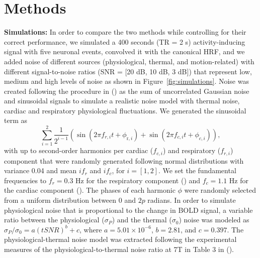 \section{Methods}
\label{sec:data}

\textbf{Simulations:} In order to compare the two methods while controlling for their correct performance, we simulated a 400 seconds (TR = 2 s) activity-inducing signal with five neuronal events, convolved it with the canonical HRF, and we added noise of different sources (physiological, thermal, and motion-related) with different signal-to-noise ratios (SNR = [20 dB, 10 dB, 3 dB]) that represent low, medium and high levels of noise as shown in Figure~\ref{fig:simulations}. Noise was created following the procedure in (\citealt{caballerogaudes2013ParadigmFreeMapping}) as the sum of uncorrelated Gaussian noise and sinusoidal signals to simulate a realistic noise model with thermal noise, cardiac and respiratory physiological fluctuations. We generated the sinusoidal term as
\begin{equation}
    \sum_{i=1}^{2} \frac{1}{2^{i-1}}\left(\sin \left(2 \pi f_{r, i} t+\phi_{\mathrm{r}, i}\right)+\sin \left(2 \pi f_{c, i} t+\phi_{c, i}\right)\right),
\end{equation}
with up to second-order harmonics per cardiac (\(f_{c,i}\)) and respiratory (\(f_{r,i}\)) component that were randomly generated following normal distributions with variance 0.04 and mean \(if_r\) and \(if_c\), for \(i = [1, 2]\). We set the fundamental frequencies to \(f_r = 0.3\) Hz for the respiratory component (\citealt{birn2006separating}) and \(f_c = 1.1\) Hz for the cardiac component (\citealt{shmueli2007low}). The phases of each harmonic \(\phi\) were randomly selected from a uniform distribution between \(0\) and \(2p\) radians. In order to simulate physiological noise that is proportional to the change in BOLD signal, a variable ratio between the physiological (\(\sigma_P\)) and the thermal (\(\sigma_0\)) noise was modeled as \(\sigma_P/\sigma_0 = a(tSNR)^b + c\), where \(a = 5.01 \times 10^{-6}\), \(b = 2.81\), and \(c = 0.397\). The physiological-thermal noise model was extracted following the experimental measures of the physiological-to-thermal noise ratio at 7T in Table 3 in (\citealt{triantafyllou2005comparison}).

